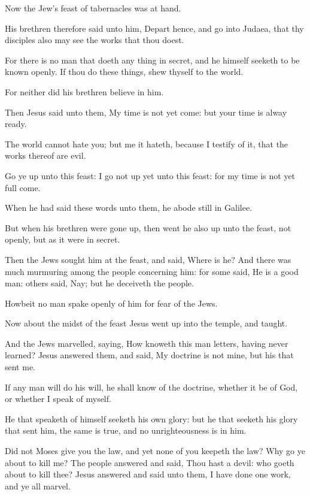 \verse Now the Jew's feast of tabernacles was at hand.

\verse His brethren therefore said unto him, Depart hence, and go into Judaea, that thy disciples also may see the works that thou doest.

\verse For there is no man that doeth any thing in secret, and he himself seeketh to be known openly. If thou do these things, shew thyself to the world.

\verse For neither did his brethren believe in him.

\verse Then Jesus said unto them, My time is not yet come: but your time is alway ready.

\verse The world cannot hate you; but me it hateth, because I testify of it, that the works thereof are evil.

\verse Go ye up unto this feast: I go not up yet unto this feast: for my time is not yet full come.

\verse When he had said these words unto them, he abode still in Galilee.

\verse But when his brethren were gone up, then went he also up unto the feast, not openly, but as it were in secret.

\verse Then the Jews sought him at the feast, and said, Where is he?  \verse And there was much murmuring among the people concerning him: for some said, He is a good man: others said, Nay; but he deceiveth the people.

\verse Howbeit no man spake openly of him for fear of the Jews.

\verse Now about the midst of the feast Jesus went up into the temple, and taught.

\verse And the Jews marvelled, saying, How knoweth this man letters, having never learned?  \verse Jesus answered them, and said, My doctrine is not mine, but his that sent me.

\verse If any man will do his will, he shall know of the doctrine, whether it be of God, or whether I speak of myself.

\verse He that speaketh of himself seeketh his own glory: but he that seeketh his glory that sent him, the same is true, and no unrighteousness is in him.

\verse Did not Moses give you the law, and yet none of you keepeth the law?  Why go ye about to kill me?  \verse The people answered and said, Thou hast a devil: who goeth about to kill thee?  \verse Jesus answered and said unto them, I have done one work, and ye all marvel.

